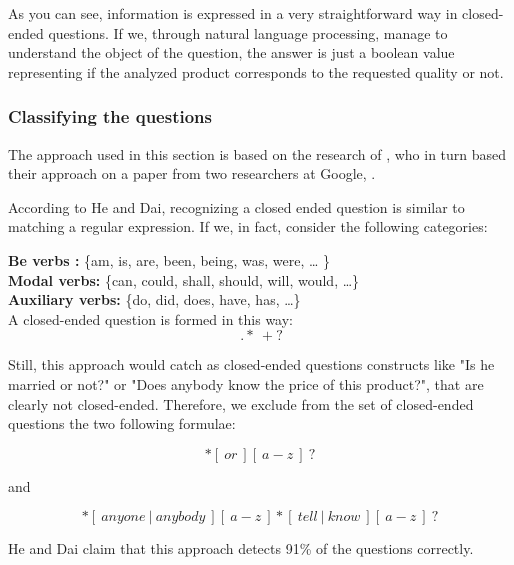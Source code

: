 \documentclass[LaM,oneside,binding=0.6cm]{sapthesis}
\begin{document}
As you can see, information is expressed in a very straightforward way in closed-ended questions. If we, through natural language processing, manage to understand the object of the question, the answer is just a boolean value representing if the analyzed product corresponds to the requested quality or not.

\subsubsection{Classifying the questions}
The approach used in this section is based on the research of \parencite{mcauley_addressing_2016}, who in turn based their approach on a paper from two researchers at Google, \parencite{he_summarization_2011}.

According to He and Dai, recognizing a closed ended question is similar to matching a regular expression.
If we, in fact, consider the following categories:

\textbf{Be verbs :} \{am, is, are, been, being, was, were, … \} \\
\textbf{Modal verbs:} \{can, could, shall, should, will, would, …\} \\
\textbf{Auxiliary verbs:} \{do, did, does, have, has, …\} \\

A closed-ended question is formed in this way:
\begin{equation} 
[ \ S_{be} \ | \ S_{modal} \ | \ S_{aux} \ ] \ .* \ + ? 
\end{equation}

Still, this approach would catch as closed-ended questions constructs like "Is he married or not?" or "Does anybody know the price of this product?", that are clearly not closed-ended. Therefore, we exclude from the set of closed-ended questions the two following formulae:

\begin{equation} 
[ \ S_{be} \ ] [ \ a-z \ ]* [ \ or \ ] [ \ a-z \ ] \ ?
\end{equation}

and

\begin{equation} 
[\ a-z \ ]* [ \ anyone \ | \ anybody \ ][ \ a-z \ ]*[ \ tell \ | \ know \ ][ \ a-z \ ] \ ?
\end{equation}

He and Dai claim that this approach detects 91\% of the questions correctly.
\end{document}

